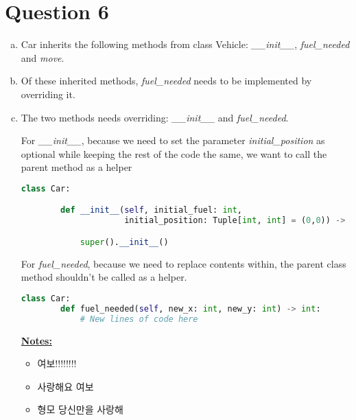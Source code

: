 \documentclass[12pt]{article}
\begin{document}
\section*{Question 6}
\begin{enumerate}[a.]
    \item Car inherits the following methods from class Vehicle: \textit{\_\_init\_\_},
    \textit{fuel\_needed} and \textit{move}.
    \item Of these inherited methods, \textit{fuel\_needed} needs to be
    implemented by overriding it.
    \item

    The two methods needs overriding: \textit{\_\_init\_\_} and \textit{fuel\_needed}.

    \bigskip

    For \textit{\_\_init\_\_}, because we need to set the parameter \textit{initial\_position}
    as optional while keeping the rest of the code the same, we want to call the
    parent method as a helper

    \begin{lstlisting}[language=Python]
    class Car:

        def __init__(self, initial_fuel: int,
                     initial_position: Tuple[int, int] = (0,0)) -> None:

            super().__init__()

    \end{lstlisting}

    \bigskip

    For \textit{fuel\_needed}, because we need to replace contents within, the
    parent class method shouldn't be called as a helper.

    \begin{lstlisting}[language=Python]
    class Car:
        def fuel_needed(self, new_x: int, new_y: int) -> int:
            # New lines of code here

    \end{lstlisting}

    \bigskip

    \underline{\textbf{Notes:}}

    \begin{itemize}
        \item 여보!!!!!!!!
        \item 사랑해요 여보
        \item 형모 당신만을 사랑해
    \end{itemize}


\end{enumerate}
\end{document}
